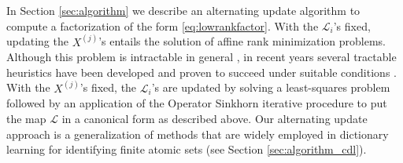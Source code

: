 \documentclass[11pt,letterpaper]{article}
\newcommand{\R}{\mathbb{R}}
\newcommand{\by}{\mathbf{y}}
\renewcommand{\L}{\mathcal{L}}
\begin{document}
%




In Section \ref{sec:algorithm} we describe an alternating update algorithm to compute a factorization of the form \eqref{eq:lowrankfactor}.  With the $\L_{i}$'s fixed, updating the $X^{(j)}$'s entails the solution of affine rank minimization problems.  Although this problem is intractable in general \cite{Nat:93}, in recent years several tractable heuristics have been developed and proven to succeed under suitable conditions \cite{GM:11,JMD:10,RFP:10}.  With the $X^{(j)}$'s fixed, the $\L_{i}$'s are updated by solving a least-squares problem followed by an application of the Operator Sinkhorn iterative procedure to put the map $\L$ in a canonical form as described above.  Our alternating update approach is a generalization of methods that are widely employed in dictionary learning for identifying finite atomic sets (see Section \ref{sec:algorithm_cdl}).
\end{document}
